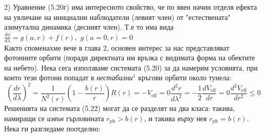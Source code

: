 2) Уравнение (5.20г) има интересното свойство, че по явен начин отделя ефекта на увличане на инициални наблюдатели (левият член) от "естествената"$\,$ азимутална динамика (десният член). Т.е то има вида $\frac{d\phi}{d\lambda} = g(a,r) + f(r),\,\, g(a = 0, r) = 0$\\

Както споменахме вече в глава 2, основен интерес за нас представляват фотонните орбити (поради директната им връзка с видимата форма на обектите на небето). Нека сега използваме системата (5.20) за да намерим условията, при които тези фотони попадат в \emph{нестабилни}$^1$ кръгови орбити около тунела:
\begin{subequations}
	\begin{equation}
	\left(\frac{dr}{d\lambda}\right)^2 = \frac{1}{N^2(r)}\left(1 - \frac{b(r)}{r}\right)R(r) = - V_\text{eff} = 0
	\end{equation}
	\begin{equation}
		\frac{d^2r}{d\lambda^2} = -\frac{1}{2}\frac{dV_{\text{eff}}}{dr} = 0
	\end{equation}
	\begin{equation}
		\frac{d^2V_\text{eff}}{dr^2} \le 0
	\end{equation}
\end{subequations}
Решенията на системата (5.22) могат да се разделят на два класа: такива, намиращи се \emph{извън} гърловината $r_{\text{ph}} > b(r)$, и такива \emph{върху} нея $r_\text{ph} = b(r)$. Нека ги разгледаме поотделно:\\
	
